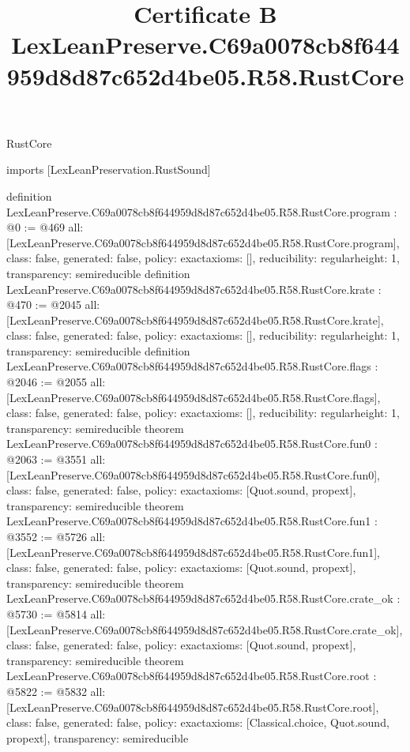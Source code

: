 \begin{lexlean}{RustCore}
\title{Certificate B LexLeanPreserve.C69a0078cb8f644959d8d87c652d4be05.R58.RustCore}
\begin{coremodule}
imports [LexLeanPreservation.RustSound]

definition LexLeanPreserve.C69a0078cb8f644959d8d87c652d4be05.R58.RustCore.program : @0 := @469 {
  all: [LexLeanPreserve.C69a0078cb8f644959d8d87c652d4be05.R58.RustCore.program],
  class: false,
  generated: false,
  policy: exact{axioms: []},
  reducibility: regular{height: 1},
  transparency: semireducible
}
definition LexLeanPreserve.C69a0078cb8f644959d8d87c652d4be05.R58.RustCore.krate : @470 := @2045 {
  all: [LexLeanPreserve.C69a0078cb8f644959d8d87c652d4be05.R58.RustCore.krate],
  class: false,
  generated: false,
  policy: exact{axioms: []},
  reducibility: regular{height: 1},
  transparency: semireducible
}
definition LexLeanPreserve.C69a0078cb8f644959d8d87c652d4be05.R58.RustCore.flags : @2046 := @2055 {
  all: [LexLeanPreserve.C69a0078cb8f644959d8d87c652d4be05.R58.RustCore.flags],
  class: false,
  generated: false,
  policy: exact{axioms: []},
  reducibility: regular{height: 1},
  transparency: semireducible
}
theorem LexLeanPreserve.C69a0078cb8f644959d8d87c652d4be05.R58.RustCore.fun0 : @2063 := @3551 {
  all: [LexLeanPreserve.C69a0078cb8f644959d8d87c652d4be05.R58.RustCore.fun0],
  class: false,
  generated: false,
  policy: exact{axioms: [Quot.sound, propext]},
  transparency: semireducible
}
theorem LexLeanPreserve.C69a0078cb8f644959d8d87c652d4be05.R58.RustCore.fun1 : @3552 := @5726 {
  all: [LexLeanPreserve.C69a0078cb8f644959d8d87c652d4be05.R58.RustCore.fun1],
  class: false,
  generated: false,
  policy: exact{axioms: [Quot.sound, propext]},
  transparency: semireducible
}
theorem LexLeanPreserve.C69a0078cb8f644959d8d87c652d4be05.R58.RustCore.crate_ok : @5730 := @5814 {
  all: [LexLeanPreserve.C69a0078cb8f644959d8d87c652d4be05.R58.RustCore.crate_ok],
  class: false,
  generated: false,
  policy: exact{axioms: [Quot.sound, propext]},
  transparency: semireducible
}
theorem LexLeanPreserve.C69a0078cb8f644959d8d87c652d4be05.R58.RustCore.root : @5822 := @5832 {
  all: [LexLeanPreserve.C69a0078cb8f644959d8d87c652d4be05.R58.RustCore.root],
  class: false,
  generated: false,
  policy: exact{axioms: [Classical.choice, Quot.sound, propext]},
  transparency: semireducible
}


\end{coremodule}
\end{lexlean}
